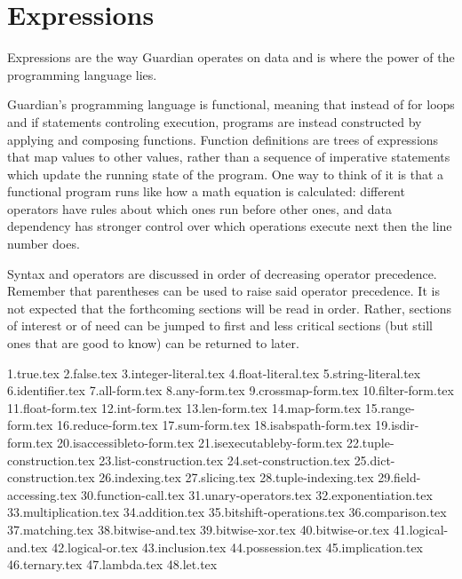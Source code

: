 
\section{Expressions}
{
	Expressions are the way Guardian operates on data and is where the power
	of the programming language lies.
	
	Guardian's programming language is functional, meaning that instead of
	for loops and if statements controling execution, programs are
	instead constructed by applying and composing functions. Function
	definitions are trees of expressions that map values to other values,
	rather than a sequence of imperative statements which update
	the running state of the program. One way to think of it is that
	a functional program runs like how a math equation is
	calculated: different operators have rules about which ones run before
	other ones, and data dependency has stronger control over which
	operations execute next then the line number does.
	
	Syntax and operators are discussed in order of decreasing operator
	precedence. Remember that parentheses can be used to raise said operator
	precedence. It is not expected that the forthcoming sections will be read
	in order. Rather, sections of interest or of need can be jumped to first
	and less critical sections (but still ones that are good to know) can be
	returned to later.
	
	{1.true.tex}
	{2.false.tex}
	{3.integer-literal.tex}
	{4.float-literal.tex}
	{5.string-literal.tex}
	{6.identifier.tex}
	{7.all-form.tex}
	{8.any-form.tex}
	{9.crossmap-form.tex}
	{10.filter-form.tex}
	{11.float-form.tex}
	{12.int-form.tex}
	{13.len-form.tex}
	{14.map-form.tex}
	{15.range-form.tex}
	{16.reduce-form.tex}
	{17.sum-form.tex}
	{18.isabspath-form.tex}
	{19.isdir-form.tex}
	{20.isaccessibleto-form.tex}
	{21.isexecutableby-form.tex}
	{22.tuple-construction.tex}
	{23.list-construction.tex}
	{24.set-construction.tex}
	{25.dict-construction.tex}
	{26.indexing.tex}
	{27.slicing.tex}
	{28.tuple-indexing.tex}
	{29.field-accessing.tex}
	{30.function-call.tex}
	{31.unary-operators.tex}
	{32.exponentiation.tex}
	{33.multiplication.tex}
	{34.addition.tex}
	{35.bitshift-operations.tex}
	{36.comparison.tex}
	{37.matching.tex}
	{38.bitwise-and.tex}
	{39.bitwise-xor.tex}
	{40.bitwise-or.tex}
	{41.logical-and.tex}
	{42.logical-or.tex}
	{43.inclusion.tex}
	{44.possession.tex}
	{45.implication.tex}
	{46.ternary.tex}
	{47.lambda.tex}
	{48.let.tex}
}











